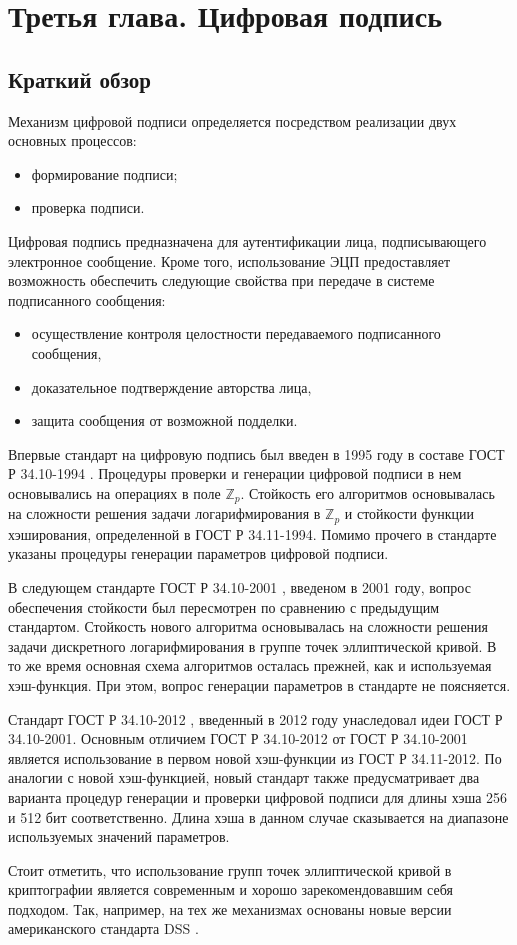 \chapter{Третья глава. Цифровая подпись}
\label{cha:ch_3}
\section{Краткий обзор}
Механизм цифровой подписи определяется посредством реализации двух основных процессов:
\begin{itemize}
	\item формирование подписи;
	\item проверка подписи.
\end{itemize}
\par
Цифровая подпись предназначена для аутентификации лица, подписывающего электронное сообщение. Кроме того, использование ЭЦП предоставляет возможность обеспечить следующие свойства при передаче в системе подписанного сообщения:
\begin{itemize}
	\item осуществление контроля целостности передаваемого подписанного сообщения,
	\item доказательное подтверждение авторства лица,
	\item защита сообщения от возможной подделки.
\end{itemize}
\par
Впервые стандарт на цифровую подпись был введен в 1995 году в составе ГОСТ Р 34.10-1994 \cite{GOST34101994}. Процедуры проверки и генерации цифровой подписи в нем основывались на операциях в поле $\mathbb{Z}_p$. Стойкость его алгоритмов основывалась на сложности решения задачи логарифмирования в $\mathbb{Z}_p$ и стойкости функции хэширования, определенной в ГОСТ Р 34.11-1994. Помимо прочего в стандарте указаны процедуры генерации параметров цифровой подписи.
\par
В следующем стандарте ГОСТ Р 34.10-2001 \cite{GOST34102001}, введеном в 2001 году, вопрос обеспечения стойкости был пересмотрен по сравнению с предыдущим стандартом. Стойкость нового алгоритма основывалась на сложности решения задачи дискретного логарифмирования в группе точек эллиптической кривой. В то же время основная схема алгоритмов осталась прежней, как и используемая хэш-функция. При этом, вопрос генерации параметров в стандарте не поясняется.
\par
Стандарт ГОСТ Р 34.10-2012 \cite{GOST34102012}, введенный в 2012 году унаследовал идеи ГОСТ Р 34.10-2001. Основным отличием ГОСТ Р 34.10-2012 от ГОСТ Р 34.10-2001 является использование в первом новой хэш-функции из ГОСТ Р 34.11-2012. По аналогии с новой хэш-функцией, новый стандарт также предусматривает два варианта процедур генерации и проверки цифровой подписи для длины хэша 256 и 512 бит соответственно. Длина хэша в данном случае сказывается на диапазоне используемых значений параметров.
\par
Стоит отметить, что использование групп точек эллиптической кривой в криптографии является современным и хорошо зарекомендовавшим себя подходом. Так, например, на тех же механизмах основаны новые версии американского стандарта DSS \cite{FIPSPUB1864}.
